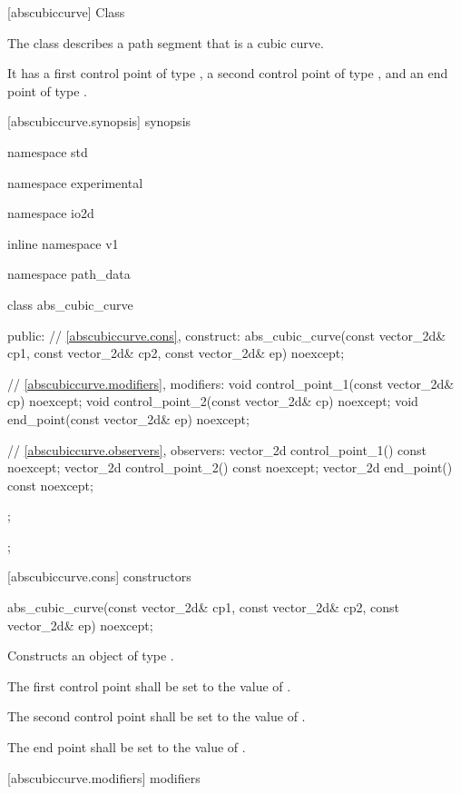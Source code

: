  [abscubiccurve] {Class }

\pnum
{}
The class  describes a path segment that is a cubic \bezierlocal curve.

\pnum
It has a first control point of type , a second control point of type , and an end point of type .

 [abscubiccurve.synopsis] { synopsis}

\begin{codeblock}
namespace std { namespace experimental { namespace io2d { inline namespace v1 {
  namespace path_data {
    class abs_cubic_curve {
    public:
      // \ref{abscubiccurve.cons}, construct:
      abs_cubic_curve(const vector_2d& cp1, const vector_2d& cp2,
        const vector_2d& ep) noexcept;

      // \ref{abscubiccurve.modifiers}, modifiers:
      void control_point_1(const vector_2d& cp) noexcept;
      void control_point_2(const vector_2d& cp) noexcept;
      void end_point(const vector_2d& ep) noexcept;


      // \ref{abscubiccurve.observers}, observers:
      vector_2d control_point_1() const noexcept;
      vector_2d control_point_2() const noexcept;
      vector_2d end_point() const noexcept;
    };
  };
} } } }
\end{codeblock}

 [abscubiccurve.cons] { constructors}

\begin{itemdecl}
    abs_cubic_curve(const vector_2d& cp1, const vector_2d& cp2,
      const vector_2d& ep) noexcept;
\end{itemdecl}
\begin{itemdescr}
	\pnum
	\effects
	Constructs an object of type .
	
	\pnum
	The first control point shall be set to the value of .
	
	\pnum
	The second control point shall be set to the value of .
	
	\pnum
	The end point shall be set to the value of .
\end{itemdescr}

 [abscubiccurve.modifiers]{ modifiers}

